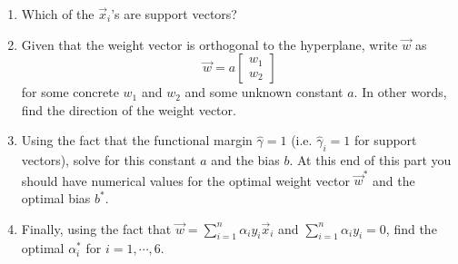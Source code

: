 \documentclass[12pt,letterpaper]{article}
\begin{document}
\begin{enumerate}
\begin{enumerate}
\item Which of the $\vec{x}_i$'s are support vectors?
\vspace{3mm}

\item Given that the weight vector is orthogonal to the hyperplane, write $\vec{w}$ as
\[ \vec{w} = a \left[\begin{array}{c}w_1 \\ w_2 \end{array}\right] \]
for some concrete $w_1$ and $w_2$ and some unknown constant $a$. In other words, find the direction of the weight vector.
\vspace{3mm}

\item Using the fact that the functional margin $\hat{\gamma} = 1$ (i.e. $\hat{\gamma}_i = 1$ for support vectors), solve for this constant $a$ and the bias $b$. At this end of this part you should have numerical values for the optimal weight vector $\vec{w}^*$ and the optimal bias $b^*$. 
\vspace{3mm}

\item Finally, using the fact that $\vec{w} = \sum_{i=1}^n \alpha_i y_i \vec{x}_i$ and $\sum_{i=1}^n \alpha_i y_i = 0$, find the optimal $\alpha_i^*$ for $i=1, \cdots, 6$.

\end{enumerate}

\end{enumerate}
\end{document}
